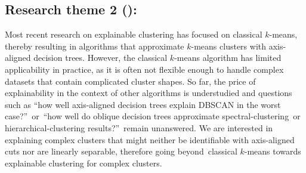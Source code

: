 \documentclass[a4paper,11pt]{article}
\begin{document}




\subsection*{Research theme 2 (\rtw): \clusterings}

Most recent research on explainable clustering has focused on classical $k$-means,
thereby resulting in algorithms that approximate $k$-means clusters with axis-aligned decision trees.
However, the classical $k$-means algorithm has limited applicability in practice, as it is often not flexible enough to handle complex datasets that contain complicated cluster shapes.
So far, the price of explainability in the context of other algorithms is understudied and questions such as ``how well axis-aligned decision trees explain DBSCAN in the worst case?''\ or\ ``how well do oblique decision trees approximate spectral-clustering~or hier\-archical-clustering results?''\ remain unanswered.
We are interested in explaining complex clusters that might neither be identifiable with axis-aligned cuts nor are linearly separable,
therefore going beyond~classical $k$-means towards explainable clustering for complex clusters.
\end{document}
